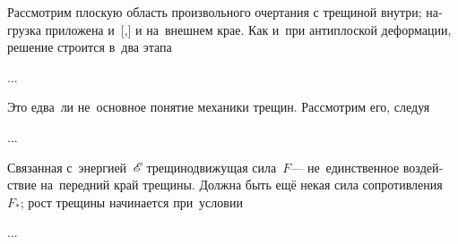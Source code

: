 
\begin{otherlanguage}{russian}

Рассмотрим плоскую область произвольного очертания с трещиной внутри; нагрузка приложена и~[,] и на~внешнем крае.
Как и~при антиплоской деформации, решение строится в~два этапа

...



\end{otherlanguage}



\begin{otherlanguage}{russian}

Это едва~ли не~основное понятие механики трещин. Рассмотрим его, следуя

...



\end{otherlanguage}



\begin{otherlanguage}{russian}

Связанная с~энергией~${\mathscr{E}\hspace{-0.2ex}}$ трещинодвижущая сила~$F$\:--- не~единственное воздействие на~передний край трещины.
Должна быть ещё некая сила сопротивления~$F_{*}$; рост трещины начинается при~условии

...



\end{otherlanguage}

